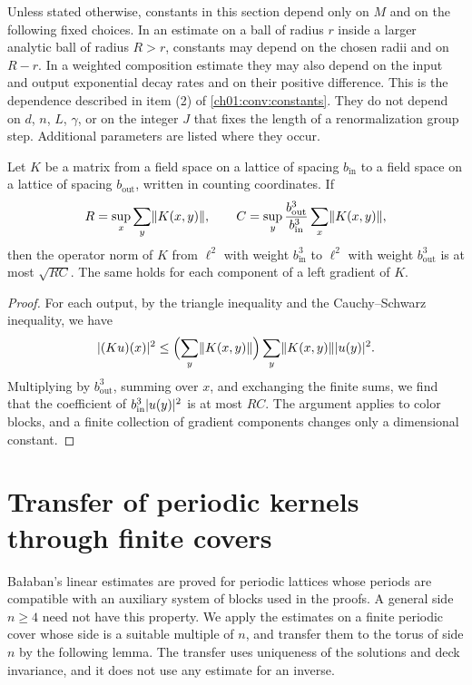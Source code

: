 Unless stated otherwise, constants in this section depend only on $M$ and on the following fixed choices. In an estimate on a ball of radius $r$ inside a larger analytic ball of radius $R>r$, constants may depend on the chosen radii and on $R-r$. In a weighted composition estimate they may also depend on the input and output exponential decay rates and on their positive difference. This is the dependence described in item (2) of \cref{ch01:conv:constants}. They do not depend on $d$, $n$, $L$, $\gamma$, or on the integer $J$ that fixes the length of a renormalization group step. Additional parameters are listed where they occur.

\begin{lemma}\label{ch06:lem:physical-schur}
Let $K$ be a matrix from a field space on a lattice of spacing $b_{\mathrm{in}}$ to a field space on a lattice of spacing $b_{\mathrm{out}}$, written in counting coordinates. If
\[
 R=\sup_x\sum_y\lVert K(x,y)\rVert,\qquad C=\sup_y\frac{b_{\mathrm{out}}^3}{b_{\mathrm{in}}^3}\sum_x\lVert K(x,y)\rVert,
\]
then the operator norm of $K$ from $\ell^2$ with weight $b_{\mathrm{in}}^3$ to $\ell^2$ with weight $b_{\mathrm{out}}^3$ is at most $\sqrt{RC}$. The same holds for each component of a left gradient of $K$.
\end{lemma}

\begin{proof}
For each output, by the triangle inequality and the Cauchy--Schwarz inequality, we have
\[
 \lvert (Ku)(x)\rvert^2\le\Bigl(\sum_y\lVert K(x,y)\rVert\Bigr)\sum_y\lVert K(x,y)\rVert\lvert u(y)\rvert^2.
\]
Multiplying by $b_{\mathrm{out}}^3$, summing over $x$, and exchanging the finite sums, we find that the coefficient of $b_{\mathrm{in}}^3\lvert u(y)\rvert^2$ is at most $RC$. The argument applies to color blocks, and a finite collection of gradient components changes only a dimensional constant.
\end{proof}

\section{Transfer of periodic kernels through finite covers}\label{ch06:sec:covers}

Bałaban's linear estimates are proved for periodic lattices whose periods are compatible with an auxiliary system of blocks used in the proofs. A general side $n\ge4$ need not have this property. We apply the estimates on a finite periodic cover whose side is a suitable multiple of $n$, and transfer them to the torus of side $n$ by the following lemma. The transfer uses uniqueness of the solutions and deck invariance, and it does not use any estimate for an inverse.

